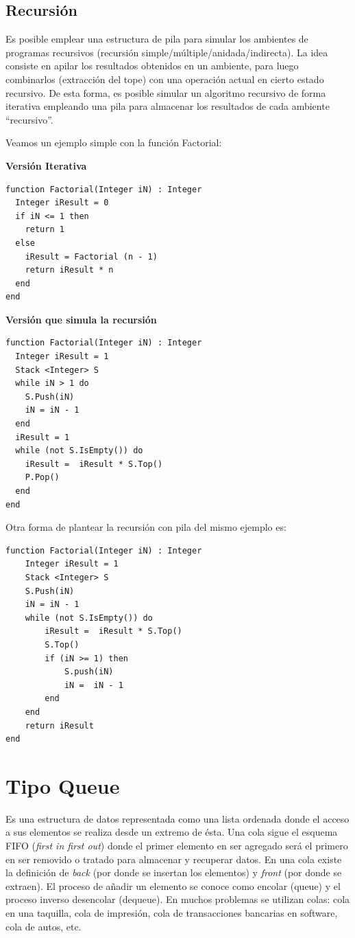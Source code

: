 \subsection{Recursión}

Es posible emplear una estructura de pila para simular los ambientes de programas recursivos (recursión simple/múltiple/anidada/indirecta). La idea consiste en apilar los resultados obtenidos en un ambiente, para luego combinarlos (extracción del tope) con una operación actual en cierto estado recursivo. De esta forma, es posible simular un algoritmo recursivo de forma iterativa empleando una pila para almacenar los resultados de cada ambiente “recursivo”.

Veamos un ejemplo simple con la función Factorial:

\textbf{Versión Iterativa}
\begin{lstlisting}[upquote=true, language=pseudo]
function Factorial(Integer iN) : Integer
  Integer iResult = 0
  if iN <= 1 then
    return 1
  else
    iResult = Factorial (n - 1)
    return iResult * n
  end
end
\end{lstlisting}

\textbf{Versión que simula la recursión}
\begin{lstlisting}[upquote=true, language=pseudo]
function Factorial(Integer iN) : Integer
  Integer iResult = 1
  Stack <Integer> S
  while iN > 1 do
    S.Push(iN)
    iN = iN - 1
  end
  iResult = 1
  while (not S.IsEmpty()) do
    iResult =  iResult * S.Top()
    P.Pop()
  end
end
\end{lstlisting}

Otra forma de plantear la recursión con pila del mismo ejemplo es:
\begin{lstlisting}[upquote=true, language=pseudo]
function Factorial(Integer iN) : Integer
    Integer iResult = 1
    Stack <Integer> S
    S.Push(iN)
    iN = iN - 1
    while (not S.IsEmpty()) do
        iResult =  iResult * S.Top()
        S.Top()
        if (iN >= 1) then
            S.push(iN)
            iN =  iN - 1
        end
    end
    return iResult
end
\end{lstlisting}

\section{Tipo Queue}

Es una estructura de datos representada como una lista ordenada donde el acceso a sus elementos se realiza desde un extremo de ésta. Una cola sigue el esquema FIFO (\textit{first in first out}) donde el primer elemento en ser agregado será el primero en ser removido o tratado para almacenar y recuperar datos. En una cola existe la definición de \textit{back} (por donde se insertan los elementos) y \textit{front} (por donde se extraen). El proceso de añadir un elemento se conoce como encolar (queue) y el proceso inverso desencolar (dequeue). En muchos problemas se utilizan colas: cola en una taquilla, cola de impresión, cola de transacciones bancarias en software, cola de autos, etc.

